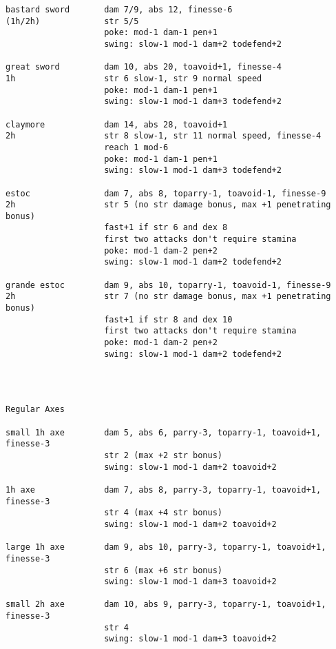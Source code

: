 \begin{verbatim}
bastard sword       dam 7/9, abs 12, finesse-6
(1h/2h)             str 5/5
                    poke: mod-1 dam-1 pen+1
                    swing: slow-1 mod-1 dam+2 todefend+2

great sword         dam 10, abs 20, toavoid+1, finesse-4
1h                  str 6 slow-1, str 9 normal speed
                    poke: mod-1 dam-1 pen+1
                    swing: slow-1 mod-1 dam+3 todefend+2

claymore            dam 14, abs 28, toavoid+1
2h                  str 8 slow-1, str 11 normal speed, finesse-4
                    reach 1 mod-6
                    poke: mod-1 dam-1 pen+1
                    swing: slow-1 mod-1 dam+3 todefend+2

estoc               dam 7, abs 8, toparry-1, toavoid-1, finesse-9
2h                  str 5 (no str damage bonus, max +1 penetrating bonus)
                    fast+1 if str 6 and dex 8
                    first two attacks don't require stamina
                    poke: mod-1 dam-2 pen+2
                    swing: slow-1 mod-1 dam+2 todefend+2

grande estoc        dam 9, abs 10, toparry-1, toavoid-1, finesse-9
2h                  str 7 (no str damage bonus, max +1 penetrating bonus)
                    fast+1 if str 8 and dex 10
                    first two attacks don't require stamina
                    poke: mod-1 dam-2 pen+2
                    swing: slow-1 mod-1 dam+2 todefend+2




\end{verbatim} \pagebreak[3] \begin{verbatim}
Regular Axes

small 1h axe        dam 5, abs 6, parry-3, toparry-1, toavoid+1, finesse-3
                    str 2 (max +2 str bonus)
                    swing: slow-1 mod-1 dam+2 toavoid+2

1h axe              dam 7, abs 8, parry-3, toparry-1, toavoid+1, finesse-3
                    str 4 (max +4 str bonus)
                    swing: slow-1 mod-1 dam+2 toavoid+2

large 1h axe        dam 9, abs 10, parry-3, toparry-1, toavoid+1, finesse-3
                    str 6 (max +6 str bonus)
                    swing: slow-1 mod-1 dam+3 toavoid+2

small 2h axe        dam 10, abs 9, parry-3, toparry-1, toavoid+1, finesse-3
                    str 4
                    swing: slow-1 mod-1 dam+3 toavoid+2


\end{verbatim}
